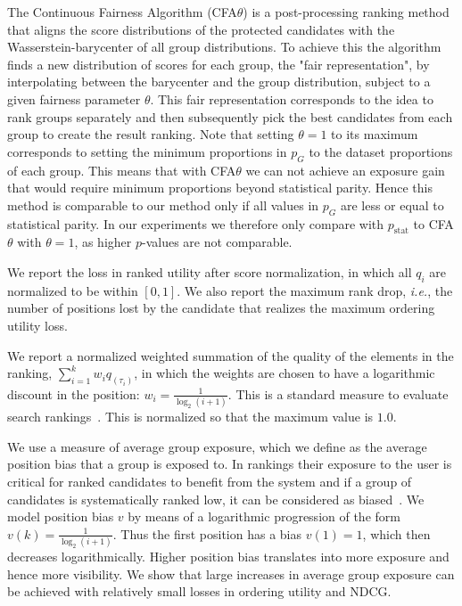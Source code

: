  The Continuous Fairness Algorithm (CFA$\theta$) is a post-processing ranking method that aligns the score distributions of the protected candidates with the Wasserstein-barycenter of all group distributions.
%
To achieve this the algorithm finds a new distribution of scores for each group, the "fair representation", by interpolating between the barycenter and the group distribution, subject to a given fairness parameter $\theta$.
%
This fair representation corresponds to the idea to rank groups separately and then subsequently pick the best candidates from each group to create the result ranking. 
%
Note that setting $\theta=1$ to its maximum corresponds to setting the minimum proportions in $p_G$ to the dataset proportions of each group.
%
This means that with CFA$\theta$ we can not achieve an exposure gain that would require minimum proportions beyond statistical parity.
%
Hence this method is comparable to our method only if all values in $p_G$ are less or equal to statistical parity.
%
In our experiments we therefore only compare \algoFAIR with $p_{\text{stat}}$ to CFA$\theta$ with $\theta=1$, as higher $p$-values are not comparable.

 We report the loss in ranked utility after score normalization, in which all $q_i$ are normalized to be within $[0, 1]$.
%
We also report the maximum rank drop, {\em i.e.}, the number of positions lost by the candidate that realizes the maximum ordering utility loss.

%
We report a normalized weighted summation of the quality of the elements in the ranking, $\sum_{i=1}^{k} w_i q_{(\tau_i)}$, in which the weights are chosen to have a logarithmic discount in the position:  $w_i = \frac{1}{\log_2 (i+1)}$. This is a standard measure to evaluate search rankings~\cite{jarvelin2002cumulated}.
%
This is normalized so that the maximum value is $1.0$.

 We use a measure of average group exposure, which we define as the average position bias that a group is exposed to. 
%
In rankings their exposure to the user is critical for ranked candidates to benefit from the system and if a group of candidates is systematically ranked low, it can be considered as biased~\cite{friedman1996bias}. 
%
We model position bias $v$ by means of a logarithmic progression of the form $v(k) = \frac{1}{\log_2(i+1)}$. 
%
Thus the first position has a bias $v(1)=1$, which then decreases logarithmically.
%
Higher position bias translates into more exposure and hence more visibility.
%
We show that large increases in average group exposure can be achieved with relatively small losses in ordering utility and NDCG.

